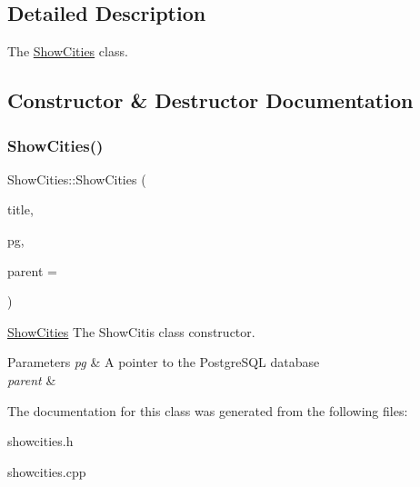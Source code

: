 \subsection{Detailed Description}
The \hyperlink{class_show_cities}{Show\+Cities} class. 

\subsection{Constructor \& Destructor Documentation}
\mbox{\label{class_show_cities_a71a514390bebd22b5e6ecbb6b731979a}} 
\subsubsection{\texorpdfstring{Show\+Cities()}{ShowCities()}}
{\footnotesize\ttfamily Show\+Cities\+::\+Show\+Cities (\begin{DoxyParamCaption}\item[{Q\+String}]{title,  }\item[{\hyperlink{classpsql}{psql} $\ast$}]{pg,  }\item[{Q\+Widget $\ast$}]{parent = {} }\end{DoxyParamCaption})\hspace{0.3cm}{\ttfamily [explicit]}}



\hyperlink{class_show_cities}{Show\+Cities} The Show\+Citis class constructor. 


\begin{DoxyParams}{Parameters}
{\em pg} & A pointer to the Postgre\+S\+QL database \\
\hline
{\em parent} & \\
\hline
\end{DoxyParams}


The documentation for this class was generated from the following files\+:\begin{DoxyCompactItemize}
\item 
showcities.\+h\item 
showcities.\+cpp\end{DoxyCompactItemize}

